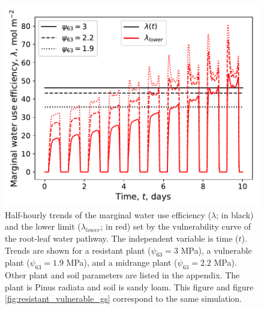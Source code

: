 \documentclass[utf8]{frontiersSCNS} %
\begin{document}
\begin{figure}[h]
    \begin{center}
         \includegraphics[scale=0.75]{lam_resistant_vulnerable.pdf}   
    \end{center}
    \caption{Half-hourly trends of the marginal water use efficiency ($\lambda$; in black) and the lower limit ($\lambda_{lower}$; in red) set by the vulnerability curve of the root-leaf water pathway. The independent variable is time ($t$). Trends are shown for a resistant plant ($\psi_{63} = 3$ MPa), a vulnerable plant ($\psi_{63} = 1.9$ MPa), and a midrange plant ($\psi_{63} = 2.2$ MPa). Other plant and soil parameters are listed in the appendix. The plant is Pinus radiata and soil is sandy loam. This figure and figure \ref{fig:resistant_vulnerable_gs} correspond to the same simulation.}
    \label{fig:resistant_vulnerable_lambda}
\end{figure}

\end{document}
